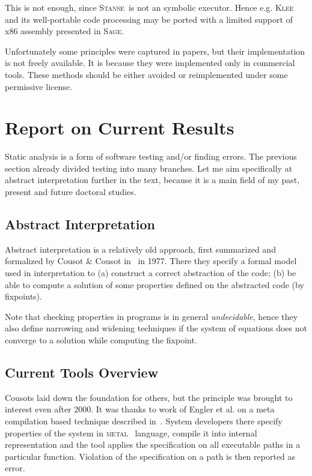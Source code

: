 \documentclass[11pt,a4paper]{article}
\newcommand{\stan}{\textsc{Stanse}}
\begin{document}
This is not enough, since \stan\ is not an symbolic executor. Hence e.g.
\textsc{Klee} and its well-portable code processing may be ported with a
limited support of x86 assembly presented in \textsc{Sage}.

Unfortunately some principles were captured in papers, but their
implementation is not freely available. It is because they were implemented
only in commercial tools. These methods should be either avoided or
reimplemented under some permissive license.

\newpage

\section{Report on Current Results}
Static analysis is a form of software testing and/or finding errors. The
previous section already divided testing into many branches. Let me aim
specifically at abstract interpretation further in the text, because it is a
main field of my past, present and future doctoral studies.

\subsection{Abstract Interpretation}
\label{cousot}
Abstract interpretation is a relatively old approach, first summarized and
formalized by Cousot \& Cousot in~\cite{cousot} in 1977. There they specify a
formal model used in interpretation to (a) construct a correct abstraction of
the code; (b) be able to compute a solution of some properties defined on the
abstracted code (by fixpoints).

Note that checking properties in programs is in general \emph{undecidable},
hence they also define narrowing and widening techniques if the system of
equations does not converge to a solution while computing the fixpoint.

\subsection{Current Tools Overview}
\label{tools}
Cousots laid down the foundation for others, but the principle was brought
to interest even after 2000. It was thanks to work of Engler et al. on a meta
compilation based technique described in~\cite{metacomp}. System developers
there specify properties of the system in \textsc{metal}~\cite{metal} language,
compile it into internal representation and the tool applies the specification
on all executable paths in a particular function. Violation of the
specification on a path is then reported as error.
\end{document}
